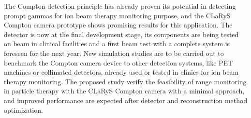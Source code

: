 The Compton detection principle has already proven its potential in detecting prompt gammas for ion beam therapy monitoring purpose, and the CLaRyS Compton camera prototype shows promising results for this application. The detector is now at the final development stage, its components are being tested on beam in clinical facilities and a first beam test with a complete system is foreseen for the next year. New simulation studies are to be carried out to benchmark the Compton camera device to other detection systems, like PET machines or collimated detectors, already used or tested in clinics for ion beam therapy monitoring. The proposed study verify the feasibility of range monitoring in particle therapy with the CLaRyS Compton camera with a minimal approach, and improved performance are expected after detector and reconstruction method optimization.           


